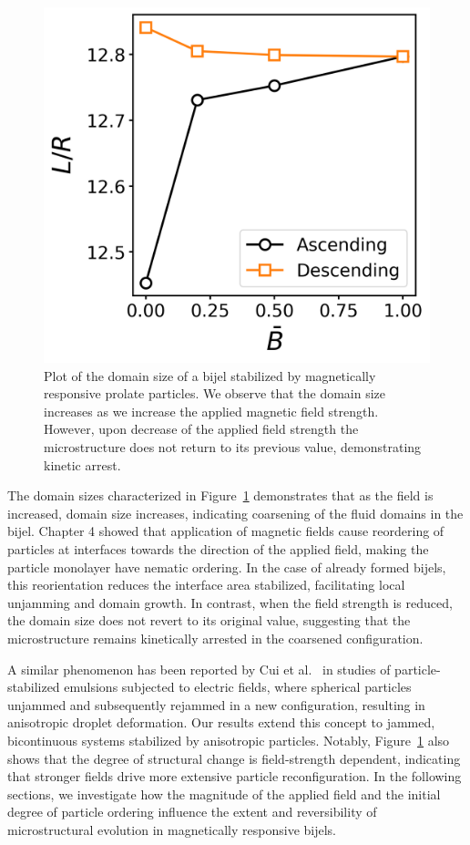 \begin{figure} 
    \centering 
    \includegraphics[scale=0.5]{../figures/results/paper2/hysteresis_curve.png} 
    \caption{Plot of the domain size of a bijel stabilized by magnetically responsive prolate particles. We observe that the domain size increases as we 
    increase the applied magnetic field strength. However, upon decrease of the applied field strength the microstructure does not return to its previous value,
    demonstrating kinetic arrest.} 
    \label{fig:hysteresis_curve} 
\end{figure}

The domain sizes characterized in Figure~\ref{fig:hysteresis_curve} demonstrates that as the field is increased, domain size increases, indicating coarsening 
of the fluid domains in the bijel. Chapter 4 showed that application of magnetic fields cause reordering of particles at interfaces towards the
direction of the applied field, making the particle monolayer have nematic ordering. In the case of already formed bijels,
this reorientation reduces the interface area stabilized, facilitating local unjamming and domain growth. In contrast, when the field strength is reduced, 
the domain size does not revert to its original value, suggesting that the microstructure remains kinetically arrested in the coarsened configuration.

A similar phenomenon has been reported by Cui et al.~\cite{cui_stabilizing_2013} in studies of particle-stabilized emulsions subjected to electric fields, 
where spherical particles unjammed and subsequently rejammed in a new configuration, resulting in anisotropic droplet deformation. Our results extend this 
concept to jammed, bicontinuous systems stabilized by anisotropic particles. Notably, Figure~\ref{fig:hysteresis_curve} also shows that the degree of 
structural change is field-strength dependent, indicating that stronger fields drive more extensive particle reconfiguration. In the following sections, 
we investigate how the magnitude of the applied field and the initial degree of particle ordering influence the extent and reversibility of microstructural 
evolution in magnetically responsive bijels.

